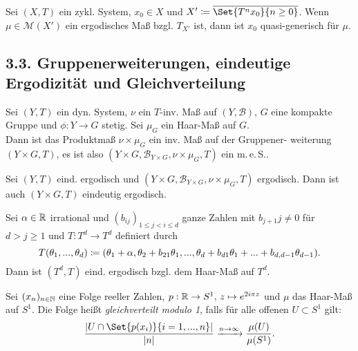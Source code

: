 \documentclass{cheat-sheet}
\newcommand{\clos}[1]{\overline{#1}} %
\newcommand{\Bor}{\mathcal{B}} %
\newcommand{\meS}{m.\,e.\,S.} %
\begin{document}
\begin{prop}
  Sei $(X, T)$ ein zykl. System, $x_0 \!\in\! X$ und $X' \coloneqq \clos{\Set{T^n x_0}{n \geq 0}}$. Wenn $\mu \in \mathcal{M}(X')$ ein ergodisches Maß bzgl. $T_{X'}$ ist, dann ist $x_0$ quasi-generisch für $\mu$.
\end{prop}

\begin{samepage}
  \section{3.3. Gruppenerweiterungen, eindeutige Ergodizität und Gleichverteilung}
\end{samepage}

\begin{defn}
  Sei $(Y, T)$ ein dyn. System, $\nu$ ein $T$-inv. Maß auf $(Y, \Bor)$, $G$ eine kompakte Gruppe und $\phi : Y \!\to\! G$ stetig.
  Sei $\mu_G$ ein Haar-Maß auf $G$. \\
  Dann ist das Produktmaß $\nu \!\times\! \mu_G$ ein inv. Maß auf der Gruppener- weiterung $(Y \!\times\! G, T)$, es ist also $(Y \!\times\! G, \Bor_{Y \times G}, \nu \!\times\! \mu_G, T)$ ein \meS{}.
\end{defn}

\begin{prop}
  Sei $(Y, T)$ eind. ergodisch und $(Y \!\times\! G, \Bor_{Y \times G}, \nu \!\times\! \mu_G, T)$ ergodisch. Dann ist auch $(Y \!\times\! G, T)$ eindeutig ergodisch.
\end{prop}


\begin{prop}
  Sei $\alpha \in \mathbb{R}$ irrational und $(b_{ij})_{1 \leq j < i \leq d}$ ganze Zahlen mit $b_{j+1}{j} \not= 0$ für $d > j \geq 1$ und $T : T^d \to T^d$ definiert durch
  \[
    T(\theta_1, ..., \theta_d) \coloneqq (\theta_1 + \alpha, \theta_2 + b_{21} \theta_1, ..., \theta_d + b_{d1} \theta_1 + ... + b_{d,d-1} \theta_{d-1}).
  \]
  Dann ist $(T^d, T)$ eind. ergodisch bzgl. dem Haar-Maß auf $T^d$.
\end{prop}

\begin{defn}
  Sei $(x_n)_{n \in \mathbb{N}}$ eine Folge reeller Zahlen, $p : \mathbb{R} \to S^1, \, z \mapsto e^{2i\pi z}$ und $\mu$ das Haar-Maß auf $S^1$.
  Die Folge heißt \emph{gleichverteilt modulo 1}, falls für alle offenen $U \subset S^1$ gilt:
  \[ \frac{\abs{U \cap \Set{p(x_i)}{i=1,\nldots,n}}}{\abs{n}} \xrightarrow{n \to \infty} \frac{\mu(U)}{\mu(S^1)}. \]
\end{defn}
\end{document}
